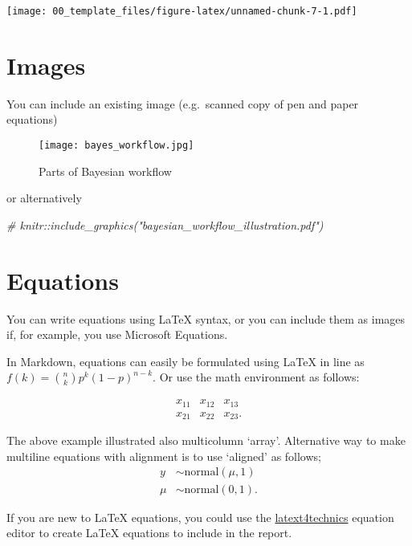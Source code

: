 \documentclass[
]{article}
\newenvironment{Shaded}{\begin{snugshade}}{\end{snugshade}}
\newcommand{\CommentTok}[1]{\textcolor[rgb]{0.56,0.35,0.01}{\textit{#1}}}
\begin{document}
\texttt{[image: 00\_template\_files/figure-latex/unnamed-chunk-7-1.pdf]}

\hypertarget{images}{%
\section{Images}\label{images}}

You can include an existing image (e.g.~scanned copy of pen and paper
equations)

\begin{figure}
\centering
\texttt{[image: bayes\_workflow.jpg]}
\caption{Parts of Bayesian workflow}
\end{figure}

or alternatively

\begin{Shaded}
\begin{Highlighting}[]
\CommentTok{\# knitr::include\_graphics("bayesian\_workflow\_illustration.pdf")}
\end{Highlighting}
\end{Shaded}

\hypertarget{equations}{%
\section{Equations}\label{equations}}

You can write equations using LaTeX syntax, or you can include them as
images if, for example, you use Microsoft Equations.

In Markdown, equations can easily be formulated using LaTeX in line as
\(f(k) = {n \choose k} p^{k} (1-p)^{n-k}\). Or use the math environment
as follows:

\[
\begin{array}{ccc}
x_{11} & x_{12} & x_{13}\\
x_{21} & x_{22} & x_{23}.
\end{array}
\]

The above example illustrated also multicolumn `array'. Alternative way
to make multiline equations with alignment is to use `aligned' as
follows; \[
\begin{aligned}
y & \sim \mathrm{normal}(\mu,1) \\
\mu & \sim \mathrm{normal}(0,1).
\end{aligned}
\]

If you are new to LaTeX equations, you could use the
\href{https://www.latex4technics.com/}{latext4technics} equation editor
to create LaTeX equations to include in the report.
\end{document}
